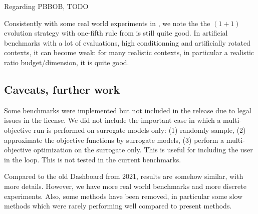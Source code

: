 Regarding PBBOB, TODO

Consistently with some real world experiments in \cite{micropredictions1,micropredictions2}, we note the the $(1+1)$ evolution strategy with one-fifth rule from \cite{rechenberg73} is still quite good. In artificial benchmarks with a lot of evaluations, high conditionning and artificially rotated contexts, it can become weak: for many realistic contexts, in particular a realistic ratio budget/dimension, it is quite good.

\subsection{Caveats, further work}
Some benchmarks were implemented but not included in the release due to legal issues in the license. 
We did not include the important case in which a multi-objective run is performed on surrogate models only: (1) randomly sample, (2) approximate the objective functions by surrogate models, (3) perform a multi-objective optimization on the surrogate only. This is useful for including the user in the loop. This is not tested in the current benchmarks.

Compared to the old Dashboard from 2021, results are somehow similar, with more details. However, we have more real world benchmarks and more discrete experiments. Also,
some methods have been removed, in particular some slow methods which were rarely performing well compared to present methods.
